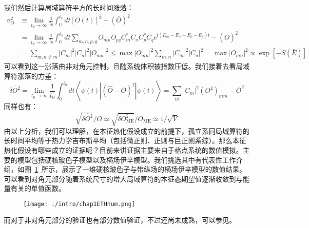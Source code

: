 我们然后计算局域算符平方的长时间涨落：
\begin{equation}
\begin{aligned}
\sigma_{O}^{2} & \equiv \lim _{t_{0} \rightarrow \infty} \frac{1}{t_{0}} \int_{0}^{t_{0}} d t[O(t)]^{2}-(\bar{O})^{2} \\
&=\lim _{t_{0} \rightarrow \infty} \frac{1}{t_{0}} \int_{0}^{t_{0}} d t \sum_{m, n, p, q} O_{m n} O_{p q} C_{m}^{*} C_{n} C_{p}^{*} C_{q} \mathrm{e}^{i\left(E_{m}-E_{n}+E_{p}-E_{q}\right) t}-(\bar{O})^{2} \\
&=\sum_{m, n \neq m}\left|C_{m}\right|^{2}\left|C_{n}\right|^{2}\left|O_{m n}\right|^{2} \leq \max \left|O_{m n}\right|^{2} \sum_{m, n}\left|C_{m}\right|^{2}\left|C_{n}\right|^{2}=\max \left|O_{m n}\right|^{2} \propto \exp [-S(\bar{E})]
\end{aligned}
\end{equation}
可以看到这一涨落由非对角元控制，且随系统体积被指数压低。我们接着去看局域算符涨落的方差：
\begin{equation}
\overline{\delta O^{2}}=\lim _{t_{0} \rightarrow \infty} \frac{1}{t_{0}} \int_{0}^{t_{0}} d t\left\langle\psi(t)\left|(\hat{O}-\bar{O})^{2}\right| \psi(t)\right\rangle=\sum_{m}\left|C_{m}\right|^{2}\left(O^{2}\right)_{m m}-\bar{O}^{2}
\end{equation}
同样也有：
\begin{equation}
\sqrt{\overline{\delta O^{2}}} / \bar{O} \simeq \sqrt{\delta O_{\mathrm{ME}}^{2}} / O_{\mathrm{ME}} \simeq 1 / \sqrt{V}
\end{equation}
由以上分析，我们可以理解，在本征热化假设成立的前提下，孤立系同局域算符的长时间平均等于热力学吉布斯平均（包括微正则、正则与巨正则系综）。那么本征热化假设有哪些成立的证据呢？目前来讲证据主要来自于格点系统的数值模拟。主要的模型包括硬核玻色子模型\cite{rigol2008thermalization,Santos2010Localization,Rigol2009Breakdown,Rigol2010Quantum,Neuenhahn2012Thermalization,Steinigeweg2013Eigenstate,Kim2014testing,beugeling2014finite,Steinigeweg2014Pushing,Khodja2015Relevance,Beugeling2015Off-diagonal}以及横场伊辛模型\cite{Fratus2015Eigenstate,Mondaini2016Eigenstate,Mondaini2017Eigenstate,blass2016test,Serbyn2013local}。我们挑选其中有代表性工作介绍，如图~\ref{ETHnum}~所示，展示了一维硬核玻色子与带纵场的横场伊辛模型的数值结果\cite{Kim2014testing}。可以看到对角元部分随着系统尺寸的增大局域算符的本征态期望值逐渐收敛到与能量有关的单值函数。
\begin{figure}[!htbp]
    \centering
    \texttt{[image: ./intro/chap1ETHnum.png]}
    \label{ETHnum}
\end{figure}
而对于非对角元部分的验证也有部分数值验证，不过还尚未成熟，可以参见\cite{Beugeling2015Off-diagonal,Mondaini2017Eigenstate}。

